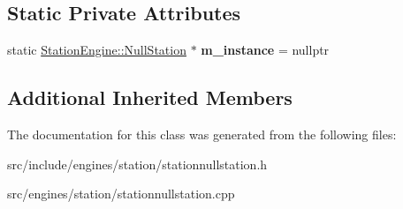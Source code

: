 \subsection*{Static Private Attributes}
\begin{DoxyCompactItemize}
\item 
\mbox{\label{classStationEngine_1_1NullStation_ab5a0e3840dc39b8e7e62c56c4847fbd3}} 
static \mbox{\hyperlink{classStationEngine_1_1NullStation}{Station\+Engine\+::\+Null\+Station}} $\ast$ {\bfseries m\+\_\+instance} = nullptr
\end{DoxyCompactItemize}
\subsection*{Additional Inherited Members}


The documentation for this class was generated from the following files\+:\begin{DoxyCompactItemize}
\item 
src/include/engines/station/stationnullstation.\+h\item 
src/engines/station/stationnullstation.\+cpp\end{DoxyCompactItemize}
